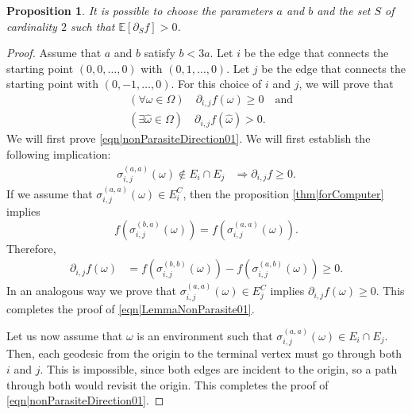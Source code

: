 \documentclass[reqno]{amsart}
\newtheorem{proposition}{Proposition}
\begin{document}
\begin{proposition}\label{thm|NonParasite}
It is possible to choose the parameters $a$ and $b$ and the set $S$ of cardinality $2$ such that $\mathbb E[\partial_Sf]>0$.
\end{proposition}
\begin{proof}
Assume that $a$ and $b$ satisfy $b<3a$. Let $i$ be the edge that connects the starting point $(0,0,\dots, 0)$ with $(0,1,\dots, 0)$. Let $j$ be 
the edge that connects the starting point with $(0,-1,\dots, 0)$. For this choice of $i$ and $j$, we will prove that 
\begin{align}
&\left(\forall \omega\in\Omega\right) \quad \partial_{i,j}f(\omega)\geq 0 \quad\text{and} \label{eqn|nonParasiteDirection01}\\
&\left(\exists\hat\omega\in\Omega\right) \quad \partial_{i,j}f(\hat\omega)>0. \label{eqn|nonParasiteDirection02}\end{align} 
We will first prove 
\eqref{eqn|nonParasiteDirection01}. 
We will first establish the following implication:
\begin{align} 
\sigma_{i,j}^{(a,a)}(\omega)\not\in E_i\cap  E_j&\Longrightarrow  \partial_{i,j} f\geq 0. \label{eqn|LemmaNonParasite01}
\end{align}
If we assume that $\sigma_{i,j}^{(a,a)}(\omega)\in E_i^C$, then the proposition 
\ref{thm|forComputer} implies  
\[f(\sigma_{i,j}^{(b,a)}(\omega))=f(\sigma_{i,j}^{(a,a)}(\omega)).\] Therefore, 
\begin{align*}
\partial_{i,j}f(\omega)&= f(\sigma_{i,j}^{(b,b)}(\omega))-f(\sigma_{i,j}^{(a,b)}(\omega))\geq 0.
\end{align*}
In an analogous way we prove that $\sigma_{i,j}^{(a,a)}(\omega)\in  E_j^C$ implies $\partial_{i,j}f(\omega)\geq 0$. This completes the proof of \eqref{eqn|LemmaNonParasite01}.

Let us now assume that $\omega$ is an environment such that 
$\sigma_{i,j}^{(a,a)}(\omega)\in E_i\cap E_j$. Then, each geodesic from the origin to the terminal vertex must go through both $i$ and $j$. This is impossible, since both edges are incident to the origin, so a path through both would revisit the origin. This completes the proof of 
\eqref{eqn|nonParasiteDirection01}.


\end{proof}
\end{document}
